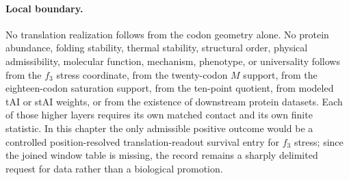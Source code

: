 \paragraph{Local boundary.}
No translation realization follows from the codon geometry alone.  No protein abundance, folding stability, thermal stability, structural order, physical admissibility, molecular function, mechanism, phenotype, or universality follows from the $f_3$ stress coordinate, from the twenty-codon $M$ support, from the eighteen-codon saturation support, from the ten-point quotient, from modeled tAI or stAI weights, or from the existence of downstream protein datasets.  Each of those higher layers requires its own matched contact and its own finite statistic.  In this chapter the only admissible positive outcome would be a controlled position-resolved translation-readout survival entry for $f_3$ stress; since the joined window table is missing, the record remains a sharply delimited request for data rather than a biological promotion.